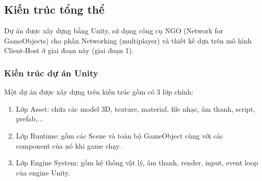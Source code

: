 \subsection{Kiến trúc tổng thể}
Dự án được xây dựng bằng Unity, sử dụng công cụ NGO (Network for GameObjects) cho phần Networking (multiplayer) và thiết kế dựa trên mô hình Client-Host ở giai đoạn này (giai đoạn 1).
\subsubsection{Kiến trúc dự án Unity}
Một dự án được xây dựng trên kiến trúc gồm có 3 lớp chính:
\begin{enumerate}[$\bullet$]
    \item Lớp Asset: chứa các model 3D, texture, material, file nhạc, âm thanh, script, prefab,...
    \item Lớp Runtime: gồm các Scene và toàn bộ GameObject cùng với các component của nó khi game chạy.
    \item Lớp Engine System: gồm hệ thống vật lý, âm thanh, render, input, event loop của engine Unity.
\end{enumerate}

